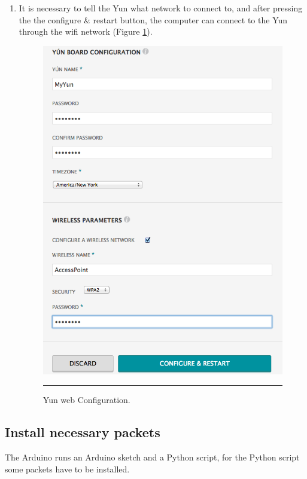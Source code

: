 \documentclass[12pt, a4paper,twoside]{tesi_upf}
\begin{document}
\begin{enumerate}
        \item It is necessary to tell the Yun what network to connect to, and after pressing the the configure \& restart button, the computer can connect to the Yun through the wifi network (Figure \ref{fig:YunWebConfig}).
          \begin{figure}[htbp]
            \centering
                \includegraphics[scale=0.3]{./Figures/YunWebConfig.png}
                \\
                \rule{15em}{0.5pt}
            \caption[Yun web Configuration]{Yun web Configuration.}
            \label{fig:YunWebConfig}
          \end{figure}
        
      \end{enumerate}
  \subsection{Install necessary packets}
    The Arduino runs an Arduino sketch and a Python script, for the Python script some packets have to be installed.
    
\end{document}
